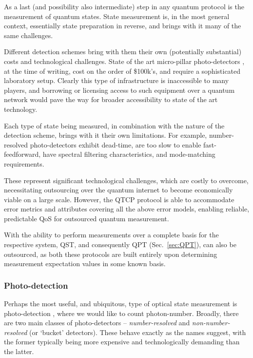 As a last (and possibility also intermediate) step in any quantum protocol is the measurement of quantum states. State measurement is, in the most general context, essentially state preparation in reverse, and brings with it many of the same challenges.

Different detection schemes bring with them their own (potentially substantial) costs and technological challenges. State of the art micro-pillar photo-detectors \cite{???}, at the time of writing, cost on the order of \$100k's, and require a sophisticated laboratory setup. Clearly this type of infrastructure is inaccessible to many players, and borrowing or licensing access to such equipment over a quantum network would pave the way for broader accessibility to state of the art technology.

Each type of state being measured, in combination with the nature of the detection scheme, brings with it their own limitations. For example, number-resolved photo-detectors exhibit dead-time, are too slow to enable fast-feedforward, have spectral filtering characteristics, and mode-matching requirements. 

These represent significant technological challenges, which are costly to overcome, necessitating outsourcing over the quantum internet to become economically viable on a large scale. However, the QTCP protocol is able to accommodate error metrics and attributes covering all the above error models, enabling reliable, predictable QoS for outsourced quantum measurement.

With the ability to perform measurements over a complete basis for the respective system, QST, and consequently QPT (Sec.~\ref{sec:QPT}), can also be outsourced, as both these protocols are built entirely upon determining measurement expectation values in some known basis.

%
%

\subsubsection{Photo-detection} \label{sec:photo_detection} 

Perhaps the most useful, and ubiquitous, type of optical state measurement is photo-detection \cite{bib:RohdePDReview}, where we would like to count photon-number. Broadly, there are two main classes of photo-detectors -- \textit{number-resolved} and \textit{non-number-resolved} (or `bucket' detectors). These behave exactly as the names suggest, with the former typically being more expensive and technologically demanding than the latter.

